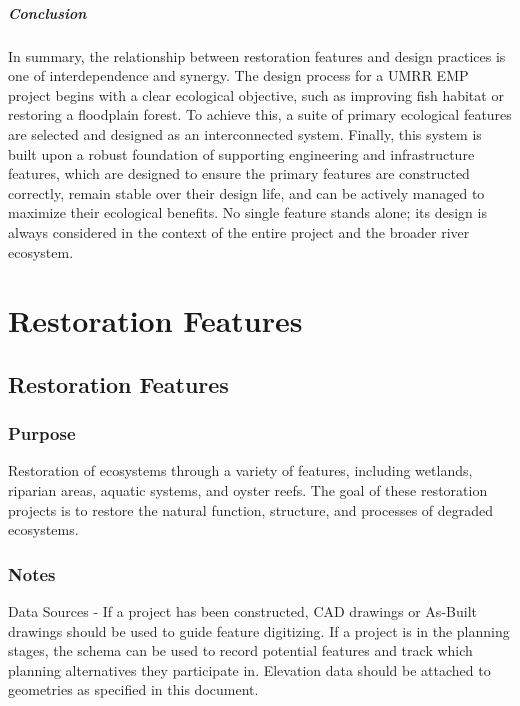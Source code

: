 \documentclass[
  letterpaper,
  DIV=11,
  numbers=noendperiod]{scrreprt}
\begin{document}
\subsubsection{Conclusion}\label{conclusion}

In summary, the relationship between restoration features and design
practices is one of interdependence and synergy. The design process for
a UMRR EMP project begins with a clear ecological objective, such as
improving fish habitat or restoring a floodplain forest. To achieve
this, a suite of primary ecological features are selected and designed
as an interconnected system. Finally, this system is built upon a robust
foundation of supporting engineering and infrastructure features, which
are designed to ensure the primary features are constructed correctly,
remain stable over their design life, and can be actively managed to
maximize their ecological benefits. No single feature stands alone; its
design is always considered in the context of the entire project and the
broader river ecosystem.

\part{Restoration Features}

\chapter{Restoration Features}\label{restoration-features-1}

\section{Purpose}\label{purpose-1}

Restoration of ecosystems through a variety of features, including
wetlands, riparian areas, aquatic systems, and oyster reefs. The goal of
these restoration projects is to restore the natural function,
structure, and processes of degraded ecosystems.

\section{Notes}\label{notes-1}

Data Sources - If a project has been constructed, CAD drawings or
As-Built drawings should be used to guide feature digitizing. If a
project is in the planning stages, the schema can be used to record
potential features and track which planning alternatives they
participate in. Elevation data should be attached to geometries as
specified in this document.
\end{document}
